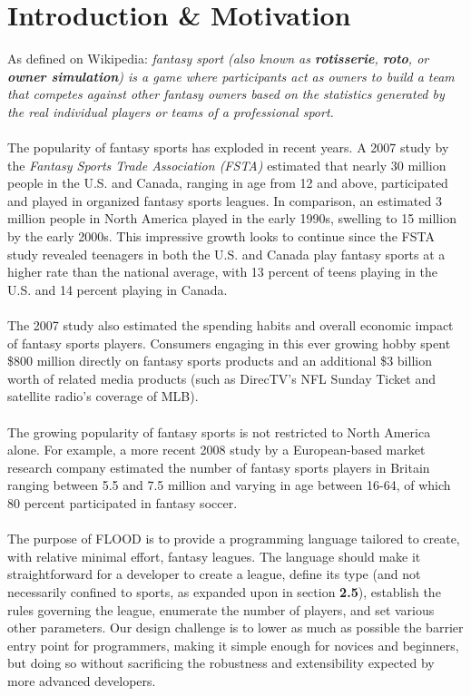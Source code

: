 \documentclass[12pt]{article}
\begin{document}
\section{Introduction \& Motivation}
As defined on Wikipedia: \textit{fantasy sport (also known as \textbf{rotisserie}, \textbf{roto}, or \textbf{owner simulation}) is a game where participants act as owners to build a team that competes against other fantasy owners based on the statistics generated by the real individual players or teams of a professional sport.}
\\\\
The popularity of fantasy sports has exploded in recent years. A 2007 study by the \textit{Fantasy Sports Trade Association (FSTA)} estimated that nearly 30 million people in the U.S. and Canada, ranging in age from 12 and above, participated and played in organized fantasy sports leagues. In comparison, an estimated 3 million people in North America played in the early 1990s, swelling to 15 million by the early 2000s. This impressive growth looks to continue since the FSTA study revealed teenagers in both the U.S. and Canada play fantasy sports at a higher rate than the national average, with 13 percent of teens playing in the U.S. and 14 percent playing in Canada.
\\\\
The 2007 study also estimated the spending habits and overall economic impact of fantasy sports players. Consumers engaging in this ever growing hobby spent \$800 million directly on fantasy sports products and an additional \$3 billion worth of related media products (such as DirecTV's NFL Sunday Ticket and satellite radio's coverage of MLB).
\\\\
The growing popularity of fantasy sports is not restricted to North America alone. For example, a more recent 2008 study by a European-based market research company estimated the number of fantasy sports players in Britain ranging between 5.5 and 7.5 million and varying in age between 16-64, of which 80 percent participated in fantasy soccer.
\\\\
The purpose of FLOOD is to provide a programming language tailored to create, with relative minimal effort, fantasy leagues. The language should make it straightforward for a developer to create a league, define its type (and not necessarily confined to sports, as expanded upon in section \textbf{2.5}), establish the rules governing the league, enumerate the number of players, and set various other parameters. Our design challenge is to lower as much as possible the barrier entry point for programmers, making it simple enough for novices and beginners, but doing so without sacrificing the robustness and extensibility expected by more advanced developers.
\end{document}
